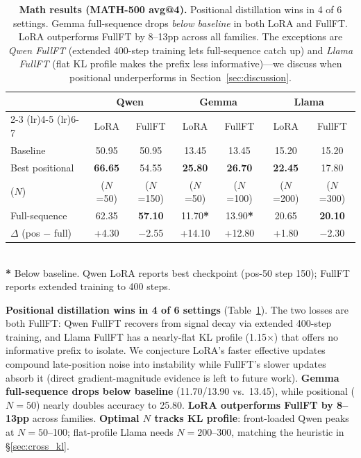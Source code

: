 \documentclass[10pt]{article}
\begin{document}
\begin{table}[t]
\centering
\caption{\textbf{Math results (MATH-500 avg@4).} Positional distillation wins in 4 of 6 settings. Gemma full-sequence drops \emph{below baseline} in both LoRA and FullFT. LoRA outperforms FullFT by 8--13pp across all families. The exceptions are \emph{Qwen FullFT} (extended 400-step training lets full-sequence catch up) and \emph{Llama FullFT} (flat KL profile makes the prefix less informative)---we discuss when positional underperforms in Section~\ref{sec:discussion}.}
\label{tab:math_main}
\small
\begin{tabular}{@{}lcccccc@{}}
\toprule
& \multicolumn{2}{c}{\textbf{Qwen}} & \multicolumn{2}{c}{\textbf{Gemma}} & \multicolumn{2}{c}{\textbf{Llama}} \\
\cmidrule(lr){2-3} \cmidrule(lr){4-5} \cmidrule(lr){6-7}
& LoRA & FullFT & LoRA & FullFT & LoRA & FullFT \\
\midrule
Baseline                & 50.95 & 50.95 & 13.45 & 13.45 & 15.20 & 15.20 \\
\midrule
Best positional         & \textbf{66.65} & 54.55 & \textbf{25.80} & \textbf{26.70} & \textbf{22.45} & 17.80 \\
\quad ($N$)             & \footnotesize{($N$=50)} & \footnotesize{($N$=150)} & \footnotesize{($N$=50)} & \footnotesize{($N$=100)} & \footnotesize{($N$=200)} & \footnotesize{($N$=300)} \\
Full-sequence           & 62.35 & \textbf{57.10} & 11.70{\color{red}\textbf{*}} & 13.90{\color{red}\textbf{*}} & 20.65 & \textbf{20.10} \\
\midrule
$\Delta$ (pos $-$ full) & +4.30 & $-$2.55 & +14.10 & +12.80 & +1.80 & $-$2.30 \\
\bottomrule
\end{tabular}
\\[2pt]
{\footnotesize {\color{red}\textbf{*}} Below baseline. Qwen LoRA reports best checkpoint (pos-50 step 150); FullFT reports extended training to 400 steps.}
\end{table}

\textbf{Positional distillation wins in 4 of 6 settings} (Table~\ref{tab:math_main}). The two losses are both FullFT: Qwen FullFT recovers from signal decay via extended 400-step training, and Llama FullFT has a nearly-flat KL profile (1.15$\times$) that offers no informative prefix to isolate. We conjecture LoRA's faster effective updates compound late-position noise into instability while FullFT's slower updates absorb it (direct gradient-magnitude evidence is left to future work).
\textbf{Gemma full-sequence drops below baseline} (11.70/13.90 vs.\ 13.45), while positional ($N{=}50$) nearly doubles accuracy to 25.80.
\textbf{LoRA outperforms FullFT by 8--13pp} across families.
\textbf{Optimal $N$ tracks KL profile}: front-loaded Qwen peaks at $N{=}50$--100; flat-profile Llama needs $N{=}200$--300, matching the heuristic in \S\ref{sec:cross_kl}.
\end{document}
